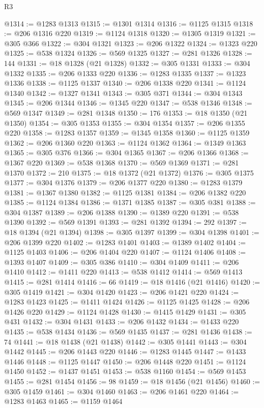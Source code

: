 \begin{lexlean}{R3}
\begin{coremodule}
@1314 := @1283 @1313
@1315 := @1301 @1314
@1316 := @1125 @1315
@1318 := @206 @1316 @220
@1319 := @1124 @1318
@1320 := @1305 @1319
@1321 := @305 @366
@1322 := @304 @1321
@1323 := @206 @1322
@1324 := @1323 @220
@1325 := @538 @1324
@1326 := @569 @1325
@1327 := @281 @1326
@1328 := 144
@1331 := @18 @1328 (@21 @1328)
@1332 := @305 @1331
@1333 := @304 @1332
@1335 := @206 @1333 @220
@1336 := @1283 @1335
@1337 := @1323 @1336
@1338 := @1125 @1337
@1340 := @206 @1338 @220
@1341 := @1124 @1340
@1342 := @1327 @1341
@1343 := @305 @371
@1344 := @304 @1343
@1345 := @206 @1344
@1346 := @1345 @220
@1347 := @538 @1346
@1348 := @569 @1347
@1349 := @281 @1348
@1350 := 176
@1353 := @18 @1350 (@21 @1350)
@1354 := @305 @1353
@1355 := @304 @1354
@1357 := @206 @1355 @220
@1358 := @1283 @1357
@1359 := @1345 @1358
@1360 := @1125 @1359
@1362 := @206 @1360 @220
@1363 := @1124 @1362
@1364 := @1349 @1363
@1365 := @305 @376
@1366 := @304 @1365
@1367 := @206 @1366
@1368 := @1367 @220
@1369 := @538 @1368
@1370 := @569 @1369
@1371 := @281 @1370
@1372 := 210
@1375 := @18 @1372 (@21 @1372)
@1376 := @305 @1375
@1377 := @304 @1376
@1379 := @206 @1377 @220
@1380 := @1283 @1379
@1381 := @1367 @1380
@1382 := @1125 @1381
@1384 := @206 @1382 @220
@1385 := @1124 @1384
@1386 := @1371 @1385
@1387 := @305 @381
@1388 := @304 @1387
@1389 := @206 @1388
@1390 := @1389 @220
@1391 := @538 @1390
@1392 := @569 @1391
@1393 := @281 @1392
@1394 := 292
@1397 := @18 @1394 (@21 @1394)
@1398 := @305 @1397
@1399 := @304 @1398
@1401 := @206 @1399 @220
@1402 := @1283 @1401
@1403 := @1389 @1402
@1404 := @1125 @1403
@1406 := @206 @1404 @220
@1407 := @1124 @1406
@1408 := @1393 @1407
@1409 := @305 @386
@1410 := @304 @1409
@1411 := @206 @1410
@1412 := @1411 @220
@1413 := @538 @1412
@1414 := @569 @1413
@1415 := @281 @1414
@1416 := 66
@1419 := @18 @1416 (@21 @1416)
@1420 := @305 @1419
@1421 := @304 @1420
@1423 := @206 @1421 @220
@1424 := @1283 @1423
@1425 := @1411 @1424
@1426 := @1125 @1425
@1428 := @206 @1426 @220
@1429 := @1124 @1428
@1430 := @1415 @1429
@1431 := @305 @431
@1432 := @304 @1431
@1433 := @206 @1432
@1434 := @1433 @220
@1435 := @538 @1434
@1436 := @569 @1435
@1437 := @281 @1436
@1438 := 74
@1441 := @18 @1438 (@21 @1438)
@1442 := @305 @1441
@1443 := @304 @1442
@1445 := @206 @1443 @220
@1446 := @1283 @1445
@1447 := @1433 @1446
@1448 := @1125 @1447
@1450 := @206 @1448 @220
@1451 := @1124 @1450
@1452 := @1437 @1451
@1453 := @538 @1160
@1454 := @569 @1453
@1455 := @281 @1454
@1456 := 98
@1459 := @18 @1456 (@21 @1456)
@1460 := @305 @1459
@1461 := @304 @1460
@1463 := @206 @1461 @220
@1464 := @1283 @1463
@1465 := @1159 @1464

\end{coremodule}
\end{lexlean}
